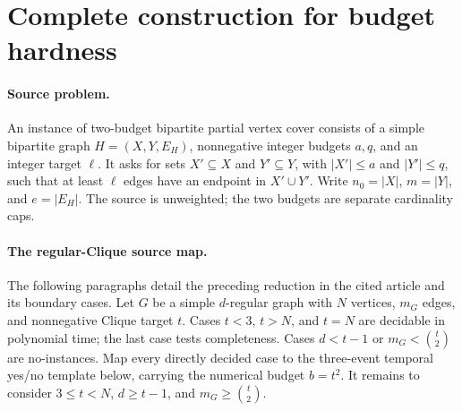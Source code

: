 \section{Complete construction for budget hardness}
\label{hard:construction}

\paragraph{Source problem.}
An instance of two-budget bipartite partial vertex cover consists of a
simple bipartite graph \(H=(X,Y,E_H)\), nonnegative integer budgets \(a,q\),
and an integer target \(\ell\). It asks for sets \(X'\subseteq X\) and
\(Y'\subseteq Y\), with \(|X'|\le a\) and \(|Y'|\le q\), such that at least
\(\ell\) edges have an endpoint in \(X'\cup Y'\).
Write \(n_0=|X|\), \(m=|Y|\), and \(e=|E_H|\).
The source is unweighted; the two budgets are separate cardinality caps.

\paragraph{The regular-Clique source map.}
\label{hard:clique-source}
The following paragraphs detail the preceding reduction in the cited
article and its boundary cases. Let \(G\) be a simple \(d\)-regular graph with \(N\)
vertices, \(m_G\) edges, and nonnegative Clique target \(t\). Cases
\(t<3\), \(t>N\), and \(t=N\) are decidable in polynomial time; the
last case tests completeness. Cases \(d<t-1\) or
\(m_G<\binom{t}{2}\) are no-instances. Map every directly decided case
to the three-event temporal yes/no template below, carrying the numerical
budget \(b=t^2\). It remains to consider
\(3\le t<N\), \(d\ge t-1\), and \(m_G\ge\binom{t}{2}\).

